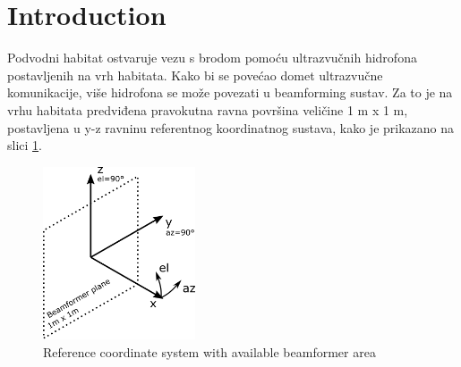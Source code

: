 \usepackage{subfigure}

\section*{Introduction}

Podvodni habitat ostvaruje vezu s brodom pomoću ultrazvučnih hidrofona postavljenih na vrh habitata. Kako bi se povećao domet ultrazvučne komunikacije, više hidrofona se može povezati u beamforming sustav. Za to je na vrhu habitata predviđena pravokutna ravna površina veličine 1 m x 1 m, postavljena u y-z ravninu referentnog koordinatnog sustava, kako je prikazano na slici \ref{fig:coord}.
\begin{figure}[h!]
   \centering
   \includegraphics[width=0.4\textwidth]{coord.png}
   \caption{Reference coordinate system with available beamformer area}
   \label{fig:coord}
\end{figure}

